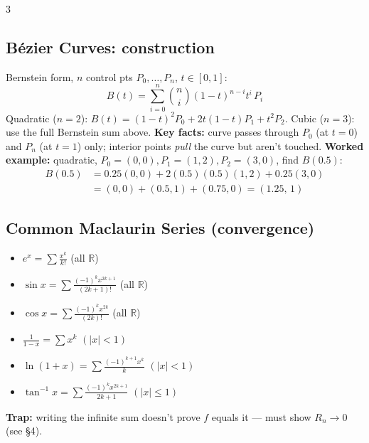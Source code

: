 \documentclass[9pt]{extarticle}
\newcommand{\hl}[1]{\textbf{\textcolor{BrickRed}{#1}}}
\begin{document}
\begin{multicols}{3}
\subsection{B\'ezier Curves: construction}
Bernstein form, $n$ control pts $P_0,\dots,P_n$, $t\in[0,1]$:
\begin{equation*}
B(t)=\sum_{i=0}^n \binom{n}{i}(1-t)^{n-i}t^i\,P_i
\end{equation*}
Quadratic ($n{=}2$): $B(t)=(1{-}t)^2P_0+2t(1{-}t)P_1+t^2P_2$. Cubic ($n{=}3$): use the full Bernstein sum above.
\textbf{Key facts:} curve passes through $P_0$ (at $t{=}0$) and $P_n$ (at $t{=}1$) only; interior points \emph{pull} the curve but aren't touched.
\textbf{Worked example:} quadratic, $P_0=(0,0),P_1=(1,2),P_2=(3,0)$, find $B(0.5)$:
\begin{align*}
B(0.5)&=0.25(0,0)+2(0.5)(0.5)(1,2)+0.25(3,0)\\
&=(0,0)+(0.5,1)+(0.75,0)=(1.25,\,1)
\end{align*}

\subsection{Common Maclaurin Series (convergence)}
\begin{itemize}
\item $e^x=\sum\frac{x^k}{k!}$ (all $\mathbb R$)
\item $\sin x=\sum\frac{(-1)^k x^{2k+1}}{(2k+1)!}$ (all $\mathbb R$)
\item $\cos x=\sum\frac{(-1)^k x^{2k}}{(2k)!}$ (all $\mathbb R$)
\item $\frac1{1-x}=\sum x^k$ $(|x|<1)$
\item $\ln(1+x)=\sum\frac{(-1)^{k+1}x^k}{k}$ $(|x|<1)$
\item $\tan^{-1}x=\sum\frac{(-1)^k x^{2k+1}}{2k+1}$ $(|x|\le1)$
\end{itemize}
\hl{Trap:} writing the infinite sum doesn't prove $f$ equals it — must show $R_n\to0$ (see \S4).

\end{multicols}
\end{document}

